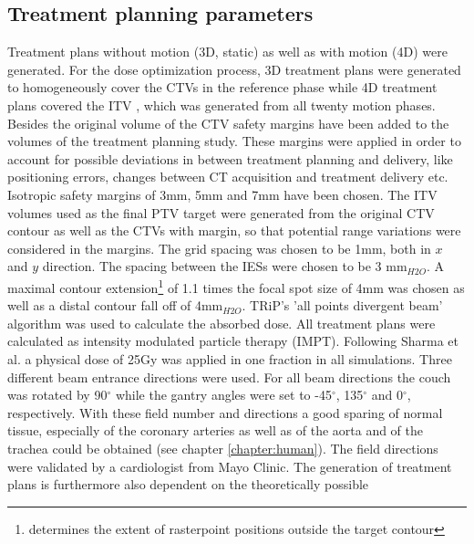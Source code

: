 \subsection{Treatment planning parameters}
\label{mdacc:tpp}
Treatment plans without motion (3D, static) as well as with motion (4D) were generated. 
For the dose optimization process, 3D treatment plans were generated to homogeneously cover the CTVs in the reference phase while 4D treatment
plans covered the ITV \cite{Gra12}, which was generated from all twenty motion phases. 
Besides the original volume of the CTV safety margins have been added to the volumes of the treatment planning study. These margins were applied 
in order to account for possible deviations in between treatment planning and delivery, like positioning errors, changes 
between CT acquisition and treatment delivery etc. Isotropic safety margins of 3mm, 5mm and 7mm have been chosen. The ITV volumes used as the 
final PTV target were generated from the original CTV contour as well as the CTVs with margin, so that potential range variations were 
considered in the margins.\newline
\newline
The grid spacing was chosen to be 1$\mathrm{mm}$, both in $x$ and $y$ direction. The spacing between the IESs were chosen to be 3 mm$_{H2O}$. 
A maximal contour extension\footnote{determines the extent of rasterpoint positions outside the target contour} of 1.1 times the focal 
spot size of 4mm was chosen as well as a distal contour fall off of 4mm$_{H2O}$. TRiP's 'all points divergent beam' algorithm was used to 
calculate the absorbed dose. All treatment plans were calculated as intensity modulated particle therapy (IMPT). 
Following Sharma et al. \cite{Sha10} a physical dose of 25Gy was applied in one fraction in all simulations.\newline
\newline
Three different beam entrance directions were used. For all beam directions the couch was rotated by 90$^{\circ}$ while the 
gantry angles were set to -45$^{\circ}$, 135$^{\circ}$ and 0$^{\circ}$, respectively. With these field number and directions a good sparing 
of normal tissue, especially of the coronary arteries as well as of the aorta and of the trachea could be obtained (see chapter \ref{chapter:human}). 
The field directions were validated by a cardiologist from Mayo Clinic.\newline
\newline
The generation of treatment plans is furthermore also dependent on the theoretically possible 
